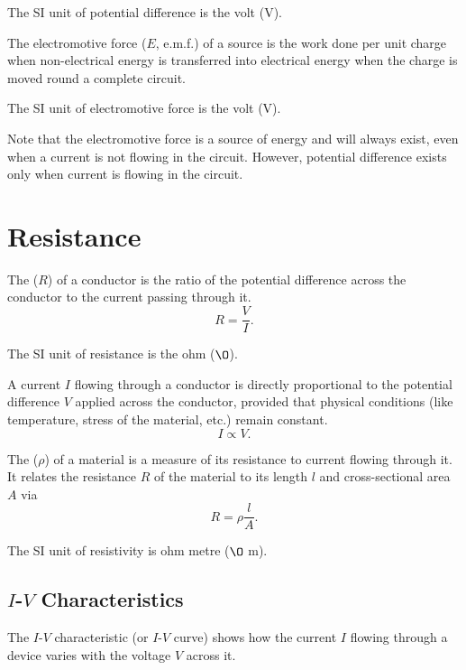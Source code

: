 The SI unit of potential difference is the volt (V).

\begin{definition}
    The electromotive force ($E$, e.m.f.) of a source is the work done per unit charge when non-electrical energy is transferred into electrical energy when the charge is moved round a complete circuit.
\end{definition}

The SI unit of electromotive force is the volt (V).

Note that the electromotive force is a source of energy and will always exist, even when a current is not flowing in the circuit. However, potential difference exists only when current is flowing in the circuit.

\section{Resistance}

\begin{definition}
    The  ($R$) of a conductor is the ratio of the potential difference across the conductor to the current passing through it. \[R = \frac{V}{I}.\]
\end{definition}

The SI unit of resistance is the ohm ($\O$).

\begin{law}
    A current $I$ flowing through a conductor is directly proportional to the potential difference $V$ applied across the conductor, provided that physical conditions (like temperature, stress of the material, etc.) remain constant. \[I \propto V.\]
\end{law}

\begin{definition}
    The  ($\rho$) of a material is a measure of its resistance to current flowing through it. It relates the resistance $R$ of the material to its length $l$ and cross-sectional area $A$ via \[R = \rho \frac{l}{A}.\]
\end{definition}

The SI unit of resistivity is ohm metre ($\O$ m).

\subsection{$I$-$V$ Characteristics}

The $I$-$V$ characteristic (or $I$-$V$ curve) shows how the current $I$ flowing through a device varies with the voltage $V$ across it.

